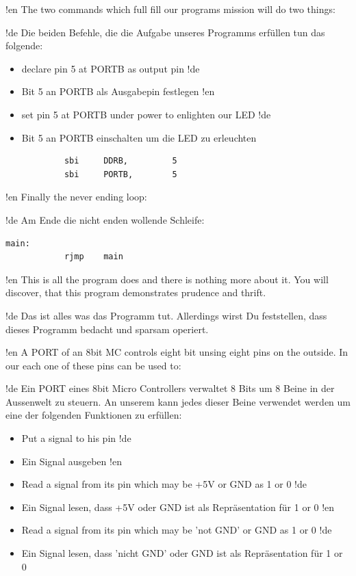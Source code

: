 !en The two commands which full fill our programs mission will do two things:

!de Die beiden Befehle, die die Aufgabe unseres Programms erfüllen tun das folgende:

\begin{itemize}
!en   \item  declare pin 5 at PORTB as output pin
!de   \item  Bit 5 an PORTB als Ausgabepin festlegen
!en   \item  set pin 5 at PORTB under power to enlighten our LED
!de   \item  Bit 5 an PORTB einschalten um die LED zu erleuchten
\end{itemize}

\begin{lstlisting}
            sbi     DDRB,         5
            sbi     PORTB,        5
\end{lstlisting}

!en Finally the never ending loop:

!de Am Ende die nicht enden wollende Schleife:

\begin{lstlisting}
main:
            rjmp    main
\end{lstlisting}

!en This is all the program does and there is nothing more about it. You will discover, that this program demonstrates prudence and thrift. 

!de Das ist alles was das Programm tut. Allerdings wirst Du feststellen, dass dieses Programm bedacht und sparsam operiert.


!en A PORT of an 8bit MC controls eight bit unsing eight pins on the outside. In our \at{} each one of these pins can be used to:

!de Ein PORT eines 8bit Micro Controllers verwaltet 8 Bits um 8 Beine in der Aussenwelt zu steuern. An unserem \at{} kann jedes dieser Beine verwendet werden um eine der folgenden Funktionen zu erfüllen:

\begin{itemize}
!en   \item Put a signal to his pin
!de   \item Ein Signal ausgeben
!en   \item Read a signal from its pin which may be +5V or GND as 1 or 0
!de   \item Ein Signal lesen, dass +5V oder GND ist als Repräsentation für 1 or 0
!en   \item Read a signal from its pin which may be 'not GND' or GND as 1 or 0
!de   \item Ein Signal lesen, dass 'nicht GND' oder GND ist als Repräsentation für 1 or 0
\end{itemize}

